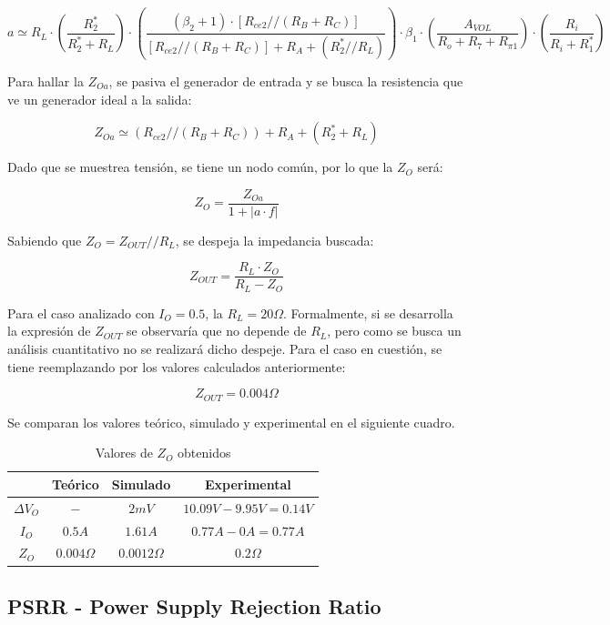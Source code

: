 \[
a \simeq R_L \cdot \left( \frac{R^*_2}{R^*_2 + R_L} \right) \cdot \left( \frac{(\beta_2 + 1) \cdot [R_{ce2}//(R_B+R_C)]}{[R_{ce2}//(R_B+R_C)] + R_A + (R^*_2 // R_L)} \right) \cdot \beta_1 \cdot \left( \frac{A_{VOL}}{R_o + R_7 + R_{\pi1}} \right) \cdot \left( \frac{R_i}{R_i + R^*_1} \right)
\]

Para hallar la $Z_{Oa}$, se pasiva el generador de entrada y se busca la resistencia que ve un generador ideal a la salida:

\[
Z_{Oa} \simeq (R_{ce2} // (R_B+R_C))+R_A+(R^*_2+R_L)
\]

Dado que se muestrea tensi\'on, se tiene un nodo com\'un, por lo que la $Z_O$ ser\'a:

\[
Z_O = \frac{Z_{Oa}}{1+|a\cdot f|}
\]

Sabiendo que $Z_O = Z_{OUT} // R_L$, se despeja la impedancia buscada:

\[
Z_{OUT} = \frac{R_L \cdot Z_O}{R_L - Z_O}
\]

Para el caso analizado con $I_O = 0.5$, la $R_L = 20\Omega$. Formalmente, si se desarrolla la expresi\'on de $Z_{OUT}$ se observar\'ia que no depende de $R_L$, pero como se busca un an\'alisis cuantitativo no se realizar\'a dicho despeje. Para el caso en cuesti\'on, se tiene reemplazando por los valores calculados anteriormente:

\[
Z_{OUT} = 0.004\Omega
\]

\newpage

Se comparan los valores te\'orico, simulado y experimental en el siguiente cuadro.

\begin{table}[!ht]

\begin{center}
\begin{tabular}{|c||c|c|c|}
\hline
& Te\'orico & Simulado & Experimental\\
\hline 
$\Delta V_O$ & $-$ & $2mV$ & $10.09V-9.95V=0.14V$\\
\hline 
$I_O$ &  $0.5A$    &   $1.61A$     & $0.77A - 0A = 0.77A$\\
\hline
$Z_O$ &   $0.004\Omega$   &    $0.0012\Omega$    & $0.2\Omega$\\
\hline
\end{tabular}
\end{center}

\caption{Valores de $Z_O$ obtenidos}
\end{table}


\subsection{PSRR - Power Supply Rejection Ratio}

